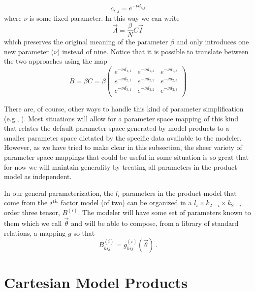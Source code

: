 \[
    c_{i,j} = e^{-\nu d_{i,j}}
\]
where $\nu$ is some fixed parameter. In this way we can write
\[
    \vec{\Lambda} = \frac{\beta}{N} C \vec{I}
\]
which preserves the original meaning of the parameter $\beta$ and only introduces one new parameter ($\nu$) instead of nine. Notice that it is possible to translate between the two approaches using the map
\[
    B = \beta C = \beta \begin{pmatrix} 
                        e^{-\nu d_{1,1}} & e^{-\nu d_{1,2}} & e^{-\nu d_{1,3}} \\
                        e^{-\nu d_{2,1}} & e^{-\nu d_{2,2}} & e^{-\nu d_{2,3}} \\
                        e^{-\nu d_{3,1}} & e^{-\nu d_{3,2}} & e^{-\nu d_{3,3}} \\
                        \end{pmatrix}
\]

There are, of course, other ways to handle this kind of parameter simplification (e.g., \cite{andemay85, andemaybook, grenande85}). Most situations will allow for a parameter space mapping of this kind that relates the default parameter space generated by model products to a smaller parameter space dictated by the specific data available to the modeler. However, as we have tried to make clear in this subsection, the sheer variety of parameter space mappings that could be useful in some situation is so great that for now we will maintain generality by treating all parameters in the product model as independent.

In our general parameterization, the $l_i$ parameters in the product model that come from the $i^{\textrm th}$ factor model (of two) can be organized in a $l_i \times k_{2-i} \times k_{2-i}$ order three tensor, $B^{(i)}$. The modeler will have some set of parameters known to them which we call $\vec{\theta}$ and will be able to compose, from a library of standard relations, a mapping $g$ so that
$$
B_{hij}^{(i)} = g_{hij}^{(i)}(\vec{\theta}) \,.
$$

\section{Cartesian Model Products}\label{worden}

